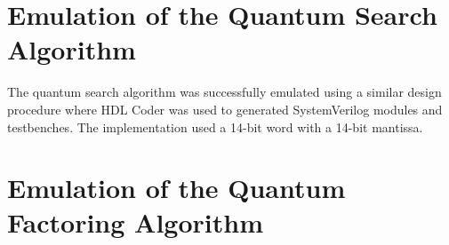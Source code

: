 \section{Emulation of the Quantum Search Algorithm}

The quantum search algorithm was successfully emulated using a similar design procedure where HDL Coder was used to generated SystemVerilog modules and testbenches. The implementation used a 14-bit word with a 14-bit mantissa.  

\section{Emulation of the Quantum Factoring Algorithm}


